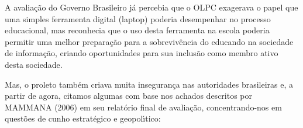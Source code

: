 \documentclass[
12pt,		%
openright,	%
twoside,  %
a4paper,			%
chapter=TITLE,		%
english,			%
french,				%
spanish,			%
brazil				%
]{USPSC-classe/USPSC}
\begin{document}
A avalia\c{c}\~ao do Governo Brasileiro j\'a percebia que o OLPC exagerava o papel que uma simples ferramenta digital (laptop) poderia desempenhar no processo educacional, mas reconhecia que o uso desta ferramenta na escola poderia \textquotedbl permitir uma melhor prepara\c{c}\~ao para a sobreviv\^encia do educando na sociedade de informa\c{c}\~ao, criando oportunidades para sua inclus\~ao como membro ativo desta sociedade\textquotedbl .

















Mas, o proleto tamb\'em criava muita inseguran\c{c}a nas autoridades brasileiras e, a partir de agora, citamos algumas com base nos achados descritos por MAMMANA (2006) em seu relat\'orio final de avalia\c{c}\~ao, concentrando-nos em quest\~oes de cunho estrat\'egico e geopol\'{\i}tico:
\end{document}

